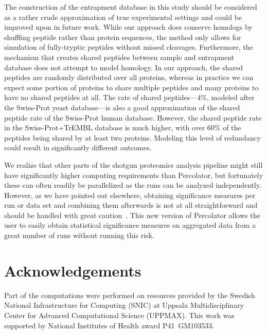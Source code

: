 \documentclass{article}
\begin{document}
The construction of the entrapment database in this study should be
considered as a rather crude approximation of true experimental
settings and could be improved upon in future work. While our approach
does conserve homologs by shuffling peptide rather than protein
sequences, the method only allows for simulation of fully-tryptic
peptides without missed cleavages.  Furthermore, the mechanism that
creates shared peptides between sample and entrapment database does
not attempt to model homology.  In our approach, the shared peptides
are randomly distributed over all proteins, whereas in practice we can
expect some portion of proteins to share multiple peptides and many
proteins to have no shared peptides at all. The rate of shared
peptides---$4\%$, modeled after the Swiss-Prot yeast database---is
also a good approximation of the shared peptide rate of the Swiss-Prot
human database. However, the shared peptide rate in the
Swiss-Prot+TrEMBL database is much higher, with over $60\%$ of the
peptides being shared by at least two proteins.  Modeling this level
of redundancy could result in significantly different outcomes.

We realize that other parts of the shotgun proteomics analysis
pipeline might still have significantly higher computing requirements
than Percolator, but fortunately these can often readily be
parallelized as the runs can be analyzed independently. However, as we
have pointed out elsewhere, obtaining significance measures per run or
data set and combining them afterwards is not at all straightforward
and should be handled with great caution~\cite{serang2015solution}.
This new version of Percolator allows the user to easily obtain
statistical significance measures on aggregated data from a great
number of runs without running this risk.

\section*{Acknowledgements}

Part of the computations were performed on resources provided by the
Swedish National Infrastructure for Computing (SNIC) at Uppsala
Multidisciplinary Center for Advanced Computational Science (UPPMAX).
This work was supported by National Institutes of Health award
P41~GM103533.



\end{document}
